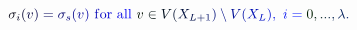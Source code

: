 \documentclass[12pt]{article}
\begin{document}
\makeatletter
\renewcommand*{\@textcolor}[3]{%
  \protect\leavevmode
  \begingroup
    \color#1{#2}#3%
  \endgroup
}
\makeatother
\begin{displaymath}
\mathcolor[RGB]{0,0,15}{\sigma} _ { \mathcolor[RGB]{0,0,30}{i} } \mathcolor[RGB]{0,0,45}{(} \mathcolor[RGB]{0,0,60}{v} \mathcolor[RGB]{0,0,75}{)} \mathcolor[RGB]{0,0,90}{=} \mathcolor[RGB]{0,0,105}{\sigma} _ { \mathcolor[RGB]{0,0,120}{s} } \mathcolor[RGB]{0,0,135}{(} \mathcolor[RGB]{0,0,150}{v} \mathcolor[RGB]{0,0,165}{)} \mathrm { ~ \mathcolor[RGB]{0,0,180}{f} \mathcolor[RGB]{0,0,195}{o} \mathcolor[RGB]{0,0,210}{r} ~ \mathcolor[RGB]{0,0,225}{a} \mathcolor[RGB]{0,0,240}{l} \mathcolor[RGB]{0,0,255}{l} ~ } \mathcolor[RGB]{0,15,0}{v} \mathcolor[RGB]{0,15,15}{\in} \mathcolor[RGB]{0,15,30}{V} \mathcolor[RGB]{0,15,45}{(} \mathcolor[RGB]{0,15,60}{X} _ { \mathcolor[RGB]{0,15,75}{L} \mathcolor[RGB]{0,15,90}{+} \mathcolor[RGB]{0,15,105}{1} } \mathcolor[RGB]{0,15,120}{)} \mathcolor[RGB]{0,15,135}{\setminus} \mathcolor[RGB]{0,15,150}{V} \mathcolor[RGB]{0,15,165}{(} \mathcolor[RGB]{0,15,180}{X} _ { \mathcolor[RGB]{0,15,195}{L} } \mathcolor[RGB]{0,15,210}{)} \mathcolor[RGB]{0,15,225}{,} \ \mathcolor[RGB]{0,15,240}{i} \mathcolor[RGB]{0,15,255}{=} \mathcolor[RGB]{0,30,0}{0} \mathcolor[RGB]{0,30,15}{,} \mathcolor[RGB]{0,30,30}{.} \mathcolor[RGB]{0,30,45}{.} \mathcolor[RGB]{0,30,60}{.} \mathcolor[RGB]{0,30,75}{,} \mathcolor[RGB]{0,30,90}{\lambda} \mathcolor[RGB]{0,30,105}{.}
\end{displaymath}
\end{document}
